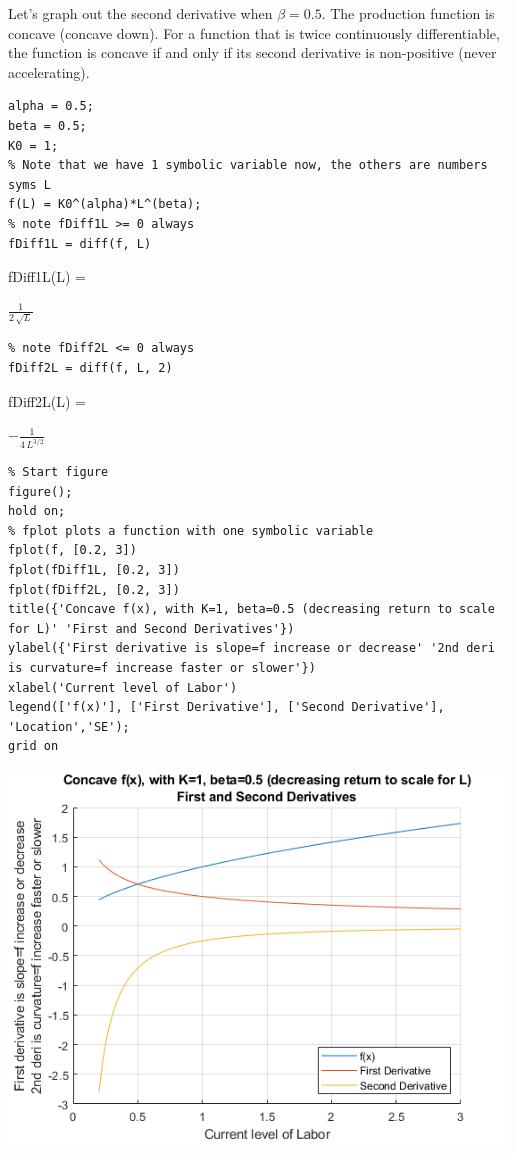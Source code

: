 \documentclass[
]{book}
\begin{document}
Let's graph out the second derivative when \(\beta =0.5\). The production
function is concave (concave down). For a function that is twice
continuously differentiable, the function is concave if and only if its
second derivative is non-positive (never accelerating).

\begin{verbatim}
alpha = 0.5;
beta = 0.5;
K0 = 1;
% Note that we have 1 symbolic variable now, the others are numbers
syms L
f(L) = K0^(alpha)*L^(beta);
% note fDiff1L >= 0 always
fDiff1L = diff(f, L)
\end{verbatim}

fDiff1L(L) =

\(\displaystyle \frac{1}{2\,\sqrt{L}}\)

\begin{verbatim}
% note fDiff2L <= 0 always
fDiff2L = diff(f, L, 2)
\end{verbatim}

fDiff2L(L) =

\(\displaystyle -\frac{1}{4\,L^{3/2} }\)

\begin{verbatim}
% Start figure
figure();
hold on;
% fplot plots a function with one symbolic variable
fplot(f, [0.2, 3])
fplot(fDiff1L, [0.2, 3])
fplot(fDiff2L, [0.2, 3])
title({'Concave f(x), with K=1, beta=0.5 (decreasing return to scale for L)' 'First and Second Derivatives'})
ylabel({'First derivative is slope=f increase or decrease' '2nd deri is curvature=f increase faster or slower'})
xlabel('Current level of Labor')
legend(['f(x)'], ['First Derivative'], ['Second Derivative'], 'Location','SE');
grid on
\end{verbatim}

\includegraphics[width=5.20833in,height=\textheight]{img/second_derivative_images/figure_0.png}
\end{document}
